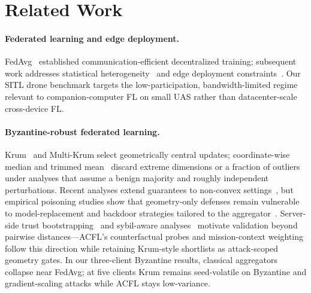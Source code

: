\documentclass[journal]{IEEEtran}
\begin{document}





\section{Related Work}
\label{sec:related}

\paragraph{Federated learning and edge deployment.}
FedAvg~\cite{mcmahan2017fedavg} established communication-efficient decentralized training; subsequent work addresses statistical heterogeneity~\cite{li2020fedprox,kairouz2021advances} and edge deployment constraints~\cite{lim2020federated,nguyen2021federated}.
Our SITL drone benchmark targets the low-participation, bandwidth-limited regime relevant to companion-computer FL on small UAS rather than datacenter-scale cross-device FL.

\paragraph{Byzantine-robust federated learning.}
Krum~\cite{blanchard2017krum} and Multi-Krum select geometrically central updates; coordinate-wise median and trimmed mean~\cite{yin2018trimmed,chen2017median} discard extreme dimensions or a fraction of outliers under analyses that assume a benign majority and roughly independent perturbations.
Recent analyses extend guarantees to non-convex settings~\cite{allenzhu2021byzantine}, but empirical poisoning studies show that geometry-only defenses remain vulnerable to model-replacement and backdoor strategies tailored to the aggregator~\cite{bhagoji2019analyzing,shejwalkar2022manipulating,fang2020local}.
Server-side trust bootstrapping~\cite{cao2021fltrust} and sybil-aware analyses~\cite{fung2020limitations} motivate validation beyond pairwise distances---ACFL's counterfactual probes and mission-context weighting follow this direction while retaining Krum-style shortlists as attack-scoped geometry gates.
In our three-client Byzantine results, classical aggregators collapse near FedAvg; at five clients Krum remains seed-volatile on Byzantine and gradient-scaling attacks while ACFL stays low-variance.
\end{document}
